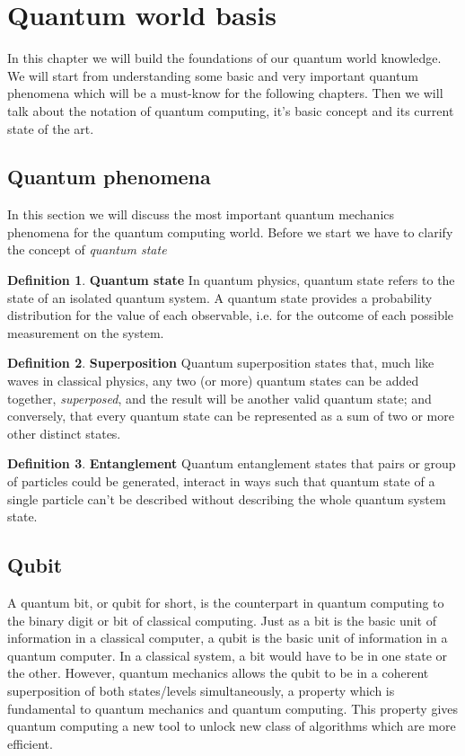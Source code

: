 \documentclass[main.tex]{subfiles}
\theoremstyle{definition}
\newtheorem{definition}{Definition}[section]
\begin{document}
\section{Quantum world basis}
In this chapter we will build the foundations of our quantum world knowledge.
We will start from understanding some basic and very important quantum phenomena which will be 
a must-know for the following chapters. Then we will talk about the notation of quantum computing, it's basic concept and its current
state of the art.
	\subsection{Quantum phenomena}
	In this section we will discuss the most important quantum mechanics phenomena for the quantum computing world.
	Before we start we have to clarify the concept of \textit{quantum state}
	
	\theoremstyle{definition}
	\begin{definition}{\textbf{Quantum state}}
	In quantum physics, quantum state refers to the state of an isolated quantum system. A quantum state provides a probability 
	distribution for the value of each observable, i.e. for the outcome of each possible measurement on the system.
	\end{definition}
	
	\theoremstyle{definition}
	\begin{definition}{\textbf{Superposition}}
	Quantum superposition states that, much like waves in classical physics, 
	any two (or more) quantum states can be added together, \textit{superposed}, and the result will be another valid quantum state; 
	and conversely, that every quantum state can be represented as a sum of two or more other distinct states.
	\end{definition}
	
	\theoremstyle{definition}
	\begin{definition}{\textbf{Entanglement}}
	Quantum entanglement states that pairs or group of particles could be generated, interact in ways such that quantum state of a 
	single particle can't be described without describing the whole quantum system state.
	\end{definition}
		
	\subsection{Qubit}
	A quantum bit, or qubit for short, is the counterpart in quantum computing to the binary digit or bit of classical computing. 
	Just as a bit is the basic unit of information in a classical computer, a qubit is the basic unit of information 
	in a quantum computer. In a classical system, a bit would have to be in one state or the other. However, quantum mechanics allows
	the qubit to be in a coherent superposition of both states/levels simultaneously, a property which is fundamental to quantum
	mechanics and quantum computing. This property gives quantum computing a new tool to unlock new class of algorithms which are 
	more efficient.
	
\end{document}
